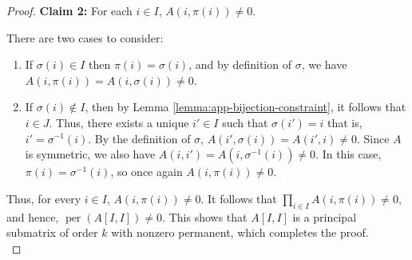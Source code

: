 \documentclass[10pt,a4paper]{amsart}
\DeclareMathOperator{\per}{per}
\begin{document}
\begin{proof}
\textbf{Claim 2:} For each \( i \in I \), \( A(i,\pi(i)) \neq 0 .\)  

There are two cases to consider:
\begin{enumerate}
    \item If \( \sigma(i) \in I \) then \( \pi(i) = \sigma(i) \), and by definition of \( \sigma \), we have
    \(
    A(i, \pi(i)) = A(i, \sigma(i)) \neq 0.
    \)
    
    \item If \( \sigma(i) \notin I \), then by Lemma \ref{lemma:app-bijection-constraint}, it follows that \( i \in J \). Thus, there exists a unique \( i' \in I \) such that \( \sigma(i') = i \) that is, \( i' = \sigma^{-1}(i) \). By the definition of \( \sigma \),
    \(
    A(i', \sigma(i)) = A(i', i) \neq 0.
    \)
    Since \( A \) is symmetric, we also have \( A(i, i') = A(i, \sigma^{-1}(i)) \neq 0 \). In this case, \( \pi(i) = \sigma^{-1}(i) \), so once again \( A(i, \pi(i)) \neq 0 \).
\end{enumerate}


Thus, for every \( i \in I \), \( A(i,\pi(i))\neq 0 \). It follows that
\(
\prod_{i \in I} A(i,\pi(i)) \neq 0,
\)
and hence,
\(
\per(A[I, I]) \neq 0.
\)
This shows that \( A[I,I] \) is a principal submatrix of order \( k \) with nonzero permanent, which completes the proof. \\
\end{proof}
\end{document}
